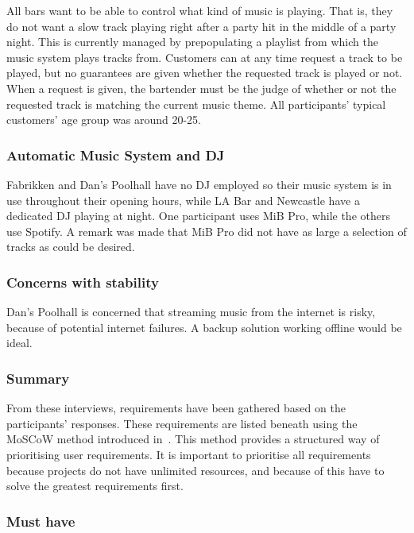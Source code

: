 All bars want to be able to control what kind of music is playing. That is, they do not want a slow track playing right after a party hit in the middle of a party night. This is currently managed by prepopulating a playlist from which the music system plays tracks from. Customers can at any time request a track to be played, but no guarantees are given whether the requested track is played or not. When a request is given, the bartender must be the judge of whether or not the requested track is matching the current music theme. All participants' typical customers' age group was around 20-25.

\subsubsection{Automatic Music System and DJ}
\label{sub:differences}
Fabrikken and Dan's Poolhall have no DJ employed so their music system is in use throughout their opening hours, while LA Bar and Newcastle have a dedicated DJ playing at night. One participant uses MiB Pro, while the others use Spotify. A remark was made that MiB Pro did not have as large a selection of tracks as could be desired.

\subsubsection{Concerns with stability}
\label{sub:specific_remarks}

Dan's Poolhall is concerned that streaming music from the internet is risky, because of potential internet failures. A backup solution working offline would be ideal.

\subsubsection{Summary}
\label{sub:summary}

From these interviews, requirements have been gathered based on the participants' responses. These requirements are listed beneath using the MoSCoW method introduced in~\cite{benyon2013designing}. This method provides a structured way of prioritising user requirements. It is important to prioritise all requirements because projects do not have unlimited resources, and because of this have to solve the greatest requirements first.

\subsubsection{Must have}

